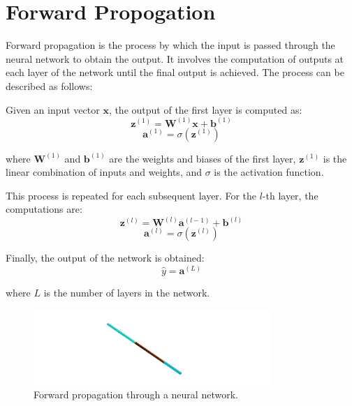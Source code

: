 \section{Forward Propogation}
    Forward propagation is the process by which the input is passed through the neural network to obtain the output. It involves the computation of outputs at each layer of the network until the final output is achieved. The process can be described as follows:

    Given an input vector \( \mathbf{x} \), the output of the first layer is computed as:
    \begin{equation}
    \mathbf{z}^{(1)} = \mathbf{W}^{(1)} \mathbf{x} + \mathbf{b}^{(1)}
    \end{equation}
    \begin{equation}
    \mathbf{a}^{(1)} = \sigma(\mathbf{z}^{(1)})
    \end{equation}

    where \( \mathbf{W}^{(1)} \) and \( \mathbf{b}^{(1)} \) are the weights and biases of the first layer, \( \mathbf{z}^{(1)} \) is the linear combination of inputs and weights, and \( \sigma \) is the activation function.

    This process is repeated for each subsequent layer. For the \( l \)-th layer, the computations are:
    \begin{equation}
    \mathbf{z}^{(l)} = \mathbf{W}^{(l)} \mathbf{a}^{(l-1)} + \mathbf{b}^{(l)}
    \end{equation}
    \begin{equation}
    \mathbf{a}^{(l)} = \sigma(\mathbf{z}^{(l)})
    \end{equation}

    Finally, the output of the network is obtained:
    \begin{equation}
    \hat{y} = \mathbf{a}^{(L)}
    \end{equation}

    where \( L \) is the number of layers in the network.

    \begin{figure}[h]
        \centering
        \includegraphics[width=0.8\textwidth]{00_Images/00_Velocity.png}
        \caption{Forward propagation through a neural network.}
        \label{fig:forward_propagation}
    \end{figure}

